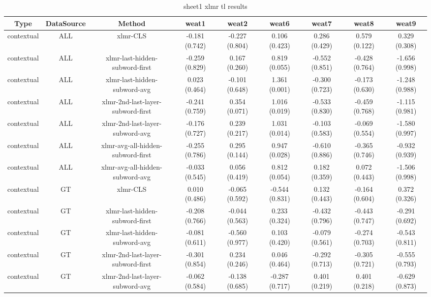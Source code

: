 \begin{sidewaystable}[htb]
    \centering
    \caption{sheet1 xlmr tl results}
    \label{appendix_tab:sheet1_xlmr_tl_results}
    \small
    \begin{tabular}{@{}ccccccccc@{}}
        \toprule
        Type & DataSource & Method & weat1 & weat2 & weat6 & weat7 & weat8 & weat9 \\
        \midrule
        contextual & ALL & xlmr-CLS & -0.181 (0.742) & -0.227 (0.804) & 0.106 (0.423) & 0.286 (0.429) & 0.579 (0.122) & 0.329 (0.308) \\
        contextual & ALL & xlmr-last-hidden-subword-first & -0.259 (0.829) & 0.167 (0.260) & 0.819 (0.055) & -0.552 (0.851) & -0.428 (0.764) & -1.656 (0.998) \\
        contextual & ALL & xlmr-last-hidden-subword-avg & 0.023 (0.464) & -0.101 (0.648) & 1.361 (0.001) & -0.300 (0.723) & -0.173 (0.630) & -1.248 (0.988) \\
        contextual & ALL & xlmr-2nd-last-layer-subword-first & -0.241 (0.759) & 0.354 (0.071) & 1.016 (0.019) & -0.533 (0.830) & -0.459 (0.768) & -1.115 (0.981) \\
        contextual & ALL & xlmr-2nd-last-layer-subword-avg & -0.176 (0.727) & 0.239 (0.217) & 1.031 (0.014) & -0.103 (0.583) & -0.069 (0.554) & -1.580 (0.997) \\
        contextual & ALL & xlmr-avg-all-hidden-subword-first & -0.255 (0.786) & 0.295 (0.144) & 0.947 (0.028) & -0.610 (0.886) & -0.365 (0.746) & -0.932 (0.939) \\
        contextual & ALL & xlmr-avg-all-hidden-subword-avg & -0.033 (0.545) & 0.056 (0.419) & 0.812 (0.054) & 0.182 (0.359) & 0.072 (0.443) & -1.506 (0.998) \\
        contextual & GT & xlmr-CLS & 0.010 (0.486) & -0.065 (0.592) & -0.544 (0.831) & 0.132 (0.443) & -0.164 (0.604) & 0.372 (0.326) \\
        contextual & GT & xlmr-last-hidden-subword-first & -0.208 (0.766) & -0.044 (0.563) & 0.233 (0.324) & -0.432 (0.796) & -0.443 (0.747) & -0.291 (0.692) \\
        contextual & GT & xlmr-last-hidden-subword-avg & -0.081 (0.611) & -0.560 (0.977) & 0.103 (0.420) & -0.079 (0.561) & -0.274 (0.703) & -0.543 (0.811) \\
        contextual & GT & xlmr-2nd-last-layer-subword-first & -0.301 (0.854) & 0.234 (0.246) & 0.046 (0.464) & -0.292 (0.713) & -0.305 (0.721) & -0.555 (0.793) \\
        contextual & GT & xlmr-2nd-last-layer-subword-avg & -0.062 (0.584) & -0.138 (0.685) & -0.287 (0.717) & 0.401 (0.219) & 0.401 (0.218) & -0.629 (0.873) \\

\end{tabular}
\end{sidewaystable}
